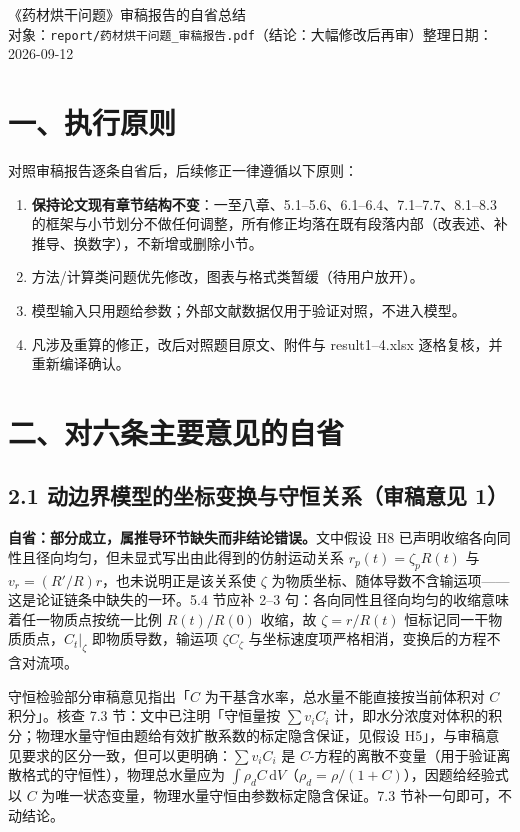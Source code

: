\documentclass[12pt,a4paper]{ctexart}
\begin{document}
\begin{center}
{\LARGE\heiti 《药材烘干问题》审稿报告的自省总结}\\[0.5em]
{\small 对象：\texttt{report/药材烘干问题\_审稿报告.pdf}（结论：大幅修改后再审）\quad 整理日期：2026-09-12}
\end{center}

\section{一、执行原则}

对照审稿报告逐条自省后，后续修正一律遵循以下原则：

\begin{enumerate}[label=(\arabic*)]
\item \textbf{保持论文现有章节结构不变}：一至八章、5.1--5.6、6.1--6.4、7.1--7.7、8.1--8.3 的框架与小节划分不做任何调整，所有修正均落在既有段落内部（改表述、补推导、换数字），不新增或删除小节。
\item 方法/计算类问题优先修改，图表与格式类暂缓（待用户放开）。
\item 模型输入只用题给参数；外部文献数据仅用于验证对照，不进入模型。
\item 凡涉及重算的修正，改后对照题目原文、附件与 result1--4.xlsx 逐格复核，并重新编译确认。
\end{enumerate}

\section{二、对六条主要意见的自省}

\subsection{2.1 动边界模型的坐标变换与守恒关系（审稿意见 1）}

\textbf{自省：部分成立，属推导环节缺失而非结论错误。}文中假设 H8 已声明收缩各向同性且径向均匀，但未显式写出由此得到的仿射运动关系 $r_p(t)=\zeta_p R(t)$ 与 $v_r=(R'/R)r$，也未说明正是该关系使 $\zeta$ 为物质坐标、随体导数不含输运项——这是论证链条中缺失的一环。5.4 节应补 2--3 句：各向同性且径向均匀的收缩意味着任一物质点按统一比例 $R(t)/R(0)$ 收缩，故 $\zeta=r/R(t)$ 恒标记同一干物质质点，$C_t|_\zeta$ 即物质导数，输运项 $\zeta C_\zeta$ 与坐标速度项严格相消，变换后的方程不含对流项。

守恒检验部分审稿意见指出「$C$ 为干基含水率，总水量不能直接按当前体积对 $C$ 积分」。核查 7.3 节：文中已注明「守恒量按 $\sum v_iC_i$ 计，即水分浓度对体积的积分；物理水量守恒由题给有效扩散系数的标定隐含保证，见假设 H5」，与审稿意见要求的区分一致，但可以更明确：$\sum v_iC_i$ 是 $C$-方程的离散不变量（用于验证离散格式的守恒性），物理总水量应为 $\int\rho_dC\,\mathrm{d}V$（$\rho_d=\rho/(1+C)$），因题给经验式以 $C$ 为唯一状态变量，物理水量守恒由参数标定隐含保证。7.3 节补一句即可，不动结论。
\end{document}
